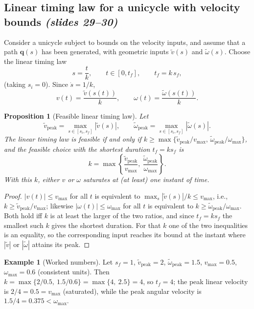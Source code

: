 \documentclass[11pt,a4paper]{article}
\newcommand{\q}{\boldsymbol{q}}
\newcommand{\vt}{\tilde v}
\newcommand{\wt}{\tilde\omega}
\theoremstyle{definition}
\newtheorem{example}[definition]{Example}
\theoremstyle{plain}
\newtheorem{proposition}[definition]{Proposition}
\theoremstyle{remark}
\begin{document}
\subsection{Linear timing law for a unicycle with velocity bounds \emph{(slides 29--30)}}
 
Consider a unicycle subject to bounds on the velocity inputs, and assume that a path $\q(s)$ has been generated, with geometric
inputs $\vt(s)$ and $\wt(s)$. Choose the linear timing law
\begin{equation}
s=\frac{t}{k},\qquad t\in[0,t_f],\qquad t_f=k\,s_f ,
\end{equation}
(taking $s_i=0$). Since $\dot s=1/k$,
\begin{equation}
v(t)=\frac{\vt(s(t))}{k},\qquad \omega(t)=\frac{\wt(s(t))}{k}.
\end{equation}
 
\begin{proposition}[Feasible linear timing law]\label{prop:timing}
Let
\[
\vt_{\mathrm{peak}}=\max_{s\in[s_i,s_f]}|\vt(s)|,\qquad \wt_{\mathrm{peak}}=\max_{s\in[s_i,s_f]}|\wt(s)| .
\]
The linear timing law is feasible if and only if $k\ge \max\{\vt_{\mathrm{peak}}/v_{\max},\,\wt_{\mathrm{peak}}/\omega_{\max}\}$, and
the feasible choice with the shortest duration $t_f=ks_f$ is
\begin{equation}
k=\max\left\{\frac{\vt_{\mathrm{peak}}}{v_{\max}},\ \frac{\wt_{\mathrm{peak}}}{\omega_{\max}}\right\}.
\end{equation}
With this $k$, either $v$ or $\omega$ saturates at (at least) one instant of time.
\end{proposition}
\begin{proof}
$|v(t)|\le v_{\max}$ for all $t$ is equivalent to $\max_s|\vt(s)|/k\le v_{\max}$, i.e., $k\ge\vt_{\mathrm{peak}}/v_{\max}$; likewise
$|\omega(t)|\le\omega_{\max}$ for all $t$ is equivalent to $k\ge\wt_{\mathrm{peak}}/\omega_{\max}$. Both hold iff $k$ is at least the larger
of the two ratios, and since $t_f=ks_f$ the smallest such $k$ gives the shortest duration. For that $k$ one of the two inequalities
is an equality, so the corresponding input reaches its bound at the instant where $|\vt|$ or $|\wt|$ attains its peak. \qedhere
\end{proof}
 
\begin{example}[Worked numbers]
Let $s_f=1$, $\vt_{\mathrm{peak}}=2$, $\wt_{\mathrm{peak}}=1.5$, $v_{\max}=0.5$, $\omega_{\max}=0.6$ (consistent units). Then
$k=\max\{2/0.5,\ 1.5/0.6\}=\max\{4,\ 2.5\}=4$, so $t_f=4$; the peak linear velocity is $2/4=0.5=v_{\max}$ (saturated), while the
peak angular velocity is $1.5/4=0.375<\omega_{\max}$.
\end{example}
 
\end{document}
